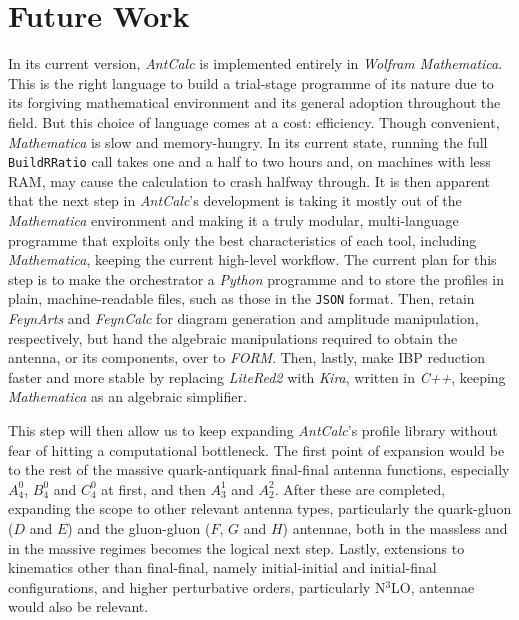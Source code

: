 \chapter{Future Work}\label{ch:futurework}

In its current version, \textit{AntCalc} is implemented entirely in \textit{Wolfram 
Mathematica}. This is the right language to build a trial-stage programme of its 
nature due to its forgiving mathematical environment and its general adoption 
throughout the field. But this choice of language comes at a cost: efficiency. 
Though convenient, \textit{Mathematica} is slow and memory-hungry. In its current state,
running the full \texttt{BuildRRatio} call takes one and a half to two hours and, on
machines with less RAM, may cause the calculation to crash halfway through. It is then 
apparent that the next step in \textit{AntCalc}'s development is taking it mostly out of 
the \textit{Mathematica} environment and making it a truly modular, multi-language programme 
that exploits only the best characteristics of each tool, including \textit{Mathematica},
keeping the current high-level workflow. 
The current plan for this step is to make the orchestrator a \textit{Python} programme 
and to store the profiles in plain, machine-readable files, such as those in the \texttt{JSON} format.
Then, retain \textit{FeynArts} and \textit{FeynCalc} for diagram generation and amplitude 
manipulation, respectively, but hand the algebraic manipulations required to obtain the 
antenna, or its components, over to \textit{FORM}. Then, lastly, make IBP reduction faster and more stable by replacing 
\textit{LiteRed2} with \textit{Kira}, written in \textit{C++}, keeping \textit{Mathematica}
as an algebraic simplifier. 



This step will then allow us to keep expanding \textit{AntCalc}'s 
profile library without fear of hitting a computational bottleneck. The first point of 
expansion would be to the rest of the massive quark-antiquark final-final antenna functions,
especially $A_4^0$, $B_4^0$ and $C_4^0$ at first, and then $A_3^1$ and $A_2^2$. 
After these are completed, expanding the 
scope to other relevant antenna types, particularly the quark-gluon ($D$ and $E$) 
and the gluon-gluon ($F$, $G$ and $H$) antennae, both in the massless and in the 
massive regimes becomes the logical next step. Lastly, extensions to kinematics other than final-final, namely 
initial-initial and initial-final configurations, 
and higher perturbative orders, particularly N$^3$LO, antennae would also be relevant.

